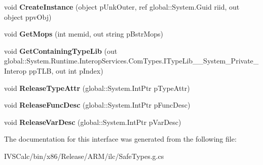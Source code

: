 \begin{DoxyCompactItemize}
void {\bfseries Create\+Instance} (object p\+Unk\+Outer, ref global\+::\+System.\+Guid riid, out object ppv\+Obj)
\item 
\mbox{\label{interface_system_1_1_runtime_1_1_interop_services_1_1_com_types_1_1_i_type_info_____system___private___interop_ad7930f0f8850b675844658850a360028}} 
void {\bfseries Get\+Mops} (int memid, out string p\+Bstr\+Mops)
\item 
\mbox{\label{interface_system_1_1_runtime_1_1_interop_services_1_1_com_types_1_1_i_type_info_____system___private___interop_acc525f75f6bdf2ae3ff9bd1d132e010e}} 
void {\bfseries Get\+Containing\+Type\+Lib} (out global\+::\+System.\+Runtime.\+Interop\+Services.\+Com\+Types.\+I\+Type\+Lib\+\_\+\+\_\+\+System\+\_\+\+Private\+\_\+\+Interop pp\+T\+LB, out int p\+Index)
\item 
\mbox{\label{interface_system_1_1_runtime_1_1_interop_services_1_1_com_types_1_1_i_type_info_____system___private___interop_a455eccf7a3747e78838d503b18d828a5}} 
void {\bfseries Release\+Type\+Attr} (global\+::\+System.\+Int\+Ptr p\+Type\+Attr)
\item 
\mbox{\label{interface_system_1_1_runtime_1_1_interop_services_1_1_com_types_1_1_i_type_info_____system___private___interop_a979479883b01e365a0b69c48061af1d5}} 
void {\bfseries Release\+Func\+Desc} (global\+::\+System.\+Int\+Ptr p\+Func\+Desc)
\item 
\mbox{\label{interface_system_1_1_runtime_1_1_interop_services_1_1_com_types_1_1_i_type_info_____system___private___interop_a20edb454819b5c39b80eedc0169c18c0}} 
void {\bfseries Release\+Var\+Desc} (global\+::\+System.\+Int\+Ptr p\+Var\+Desc)
\end{DoxyCompactItemize}


The documentation for this interface was generated from the following file\+:\begin{DoxyCompactItemize}
\item 
I\+V\+S\+Calc/bin/x86/\+Release/\+A\+R\+M/ilc/Safe\+Types.\+g.\+cs\end{DoxyCompactItemize}
